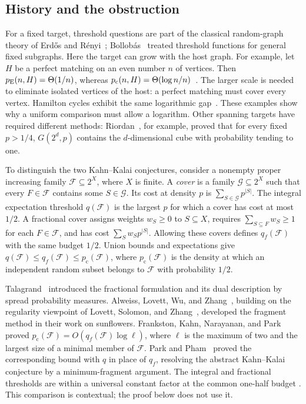 \subsection{History and the obstruction}

For a fixed target, threshold questions are part of the classical
random-graph theory of Erd\H{o}s and R\'enyi~\cite{ER60};
Bollob\'as~\cite{Bollobas81} treated threshold functions for general
fixed subgraphs. Here the target can grow with the host graph.
For example, let $H$ be a perfect matching on an even number $n$ of
vertices. Then $p_{\mathrm E}(n,H)=\Theta(1/n)$, whereas
$p_{\mathrm c}(n,H)=\Theta(\log n/n)$~\cite{ER66,KK07}.
The larger scale is needed to eliminate isolated vertices of the host:
a perfect matching must cover every vertex. Hamilton cycles exhibit
the same logarithmic gap~\cite{KK07}. These examples show why a
uniform comparison must allow a logarithm. Other spanning targets have
required different methods: Riordan~\cite{Riordan00}, for example,
proved that for every fixed $p>1/4$, $G(2^d,p)$ contains the
$d$-dimensional cube with probability tending to one.

To distinguish the two Kahn--Kalai conjectures, consider a nonempty
proper increasing family $\mathcal F\subseteq2^X$, where $X$ is finite.
A \emph{cover} is a family $\mathcal G\subseteq2^X$ such that every
$F\in\mathcal F$ contains some $S\in\mathcal G$. Its cost at density
$p$ is $\sum_{S\in\mathcal G}p^{|S|}$. The integral expectation
threshold $q(\mathcal F)$ is the largest $p$ for which a cover has
cost at most $1/2$. A fractional cover assigns weights $w_S\ge0$
to $S\subseteq X$, requires $\sum_{S\subseteq F}w_S\ge1$ for each
$F\in\mathcal F$, and has cost $\sum_S w_Sp^{|S|}$. Allowing these
covers defines $q_f(\mathcal F)$ with the same budget $1/2$.
Union bounds and expectations give
$q(\mathcal F)\le q_f(\mathcal F)\le p_{\mathrm c}(\mathcal F)$,
where $p_{\mathrm c}(\mathcal F)$ is the density at which an independent
random subset belongs to $\mathcal F$ with probability $1/2$.

Talagrand~\cite[Section~6]{Tal10} introduced the fractional formulation
and its dual description by spread probability measures.
Alweiss, Lovett, Wu, and Zhang~\cite{ALWZ21}, building on the regularity
viewpoint of Lovett, Solomon, and Zhang~\cite{LSZ19}, developed the
fragment method in their work on sunflowers. Frankston, Kahn,
Narayanan, and Park~\cite{FKNP21} proved
$p_{\mathrm c}(\mathcal F)=O(q_f(\mathcal F)\log\ell)$, where $\ell$
is the maximum of two and the largest size of a minimal member of
$\mathcal F$. Park and Pham~\cite{PP24} proved the corresponding
bound with $q$ in place of $q_f$, resolving the abstract Kahn--Kalai
conjecture by a minimum-fragment argument.
The integral and fractional thresholds are within a universal constant
factor at the common one-half budget
\cite[Theorem~1.1]{OpenAIThresholdEquivalence2026}.
This comparison is contextual; the proof below does not use it.

